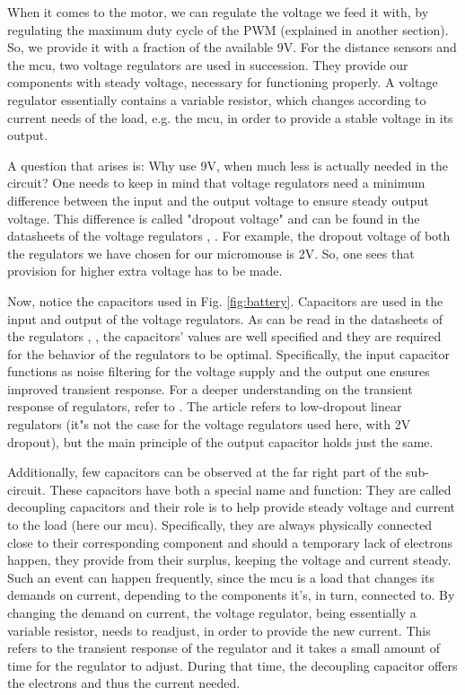 \FloatBarrier

When it comes to the motor, we can regulate the voltage we feed it with, by regulating the maximum duty cycle of the PWM (explained in another section). So, we provide it with a fraction of the available 9V.
For the distance sensors and the mcu, two voltage regulators are used in succession. They provide our components with steady voltage, necessary for functioning properly. A voltage regulator essentially contains a variable resistor, which changes according to current needs of the load, e.g. the mcu, in order to provide a stable voltage in its output.

A question that arises is: Why use 9V, when much less is actually needed in the circuit? One needs to keep in mind that voltage regulators need a minimum difference between the input and the output voltage to ensure steady output voltage. This difference is called "dropout voltage" and can be found in the datasheets of the voltage regulators \cite{3.3V}, \cite{5V}. For example, the dropout voltage of both the regulators we have chosen for our micromouse is 2V. So, one sees that provision for higher extra voltage has to be made.

Now, notice the capacitors used in Fig. \ref{fig:battery}. Capacitors are used in the input and output of the voltage regulators. As can be read in the datasheets of the regulators \cite{3.3V}, \cite{5V}, the capacitors' values are well specified and they are required for the behavior of the regulators to be optimal. Specifically, the input capacitor functions as noise filtering for the voltage supply and the output one ensures improved transient response. For a deeper understanding on the transient response of regulators, refer to \cite{regul}. The article refers to low-dropout linear regulators (it"s not the case for the voltage regulators used here, with 2V dropout), but the main principle of the output capacitor holds just the same.

Additionally,  few capacitors can be observed at the far right part of the sub-circuit.
These capacitors have both a special name and function: They are called decoupling capacitors and their role is to help provide steady voltage and current to the load (here our mcu). Specifically, they are always physically connected close to their corresponding component and should a temporary lack of electrons happen, they provide from their surplus, keeping the voltage and current steady. Such an event can happen frequently, since the mcu is a load that changes its demands on current, depending to the components it's,  in turn, connected to. By changing the demand on current, the voltage regulator, being essentially a variable resistor, needs to readjust, in order to provide the new current. This refers to the transient response of the regulator and it takes a small amount of time for the regulator to adjust. During that time, the decoupling capacitor offers the electrons and thus the current needed.

